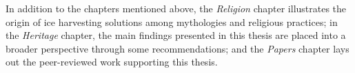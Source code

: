 In addition to the chapters mentioned above, the \textit{Religion} chapter illustrates the origin of ice harvesting
solutions among mythologies and religious practices; in the \textit{Heritage} chapter, the main findings
presented in this thesis are placed into a broader perspective through some recommendations; and the
\textit{Papers} chapter lays out the peer-reviewed work supporting this thesis.


